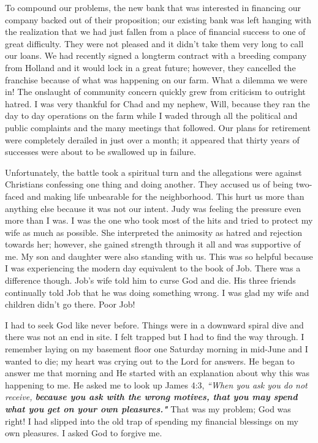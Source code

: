 \documentclass[oneside,12pt]{book}
\begin{document}
To compound our problems, the new bank that was interested in financing our company backed out of their proposition; our existing bank was left hanging with the realization that we had just fallen from a place of financial success to one of great difficulty. They were not pleased and it didn't take them very long to call our loans. We had recently signed a longterm contract with a breeding company from Holland and it would lock in a great future; however, they cancelled the franchise because of what was happening on our farm. What a dilemma we were in! The onslaught of community concern quickly grew from criticism to outright hatred. I was very thankful for Chad and my nephew, Will, because they ran the day to day operations on the farm while I waded through all the political and public complaints and the many meetings that followed. Our plans for retirement were completely derailed in just over a month; it appeared that thirty years of successes were about to be swallowed up in failure.

Unfortunately, the battle took a spiritual turn and the allegations were against Christians confessing one thing and doing another. They accused us of being two-faced and making life unbearable for the neighborhood. This hurt us more than anything else because it was not our intent. Judy was feeling the pressure even more than I was. I was the one who took most of the hits and tried to protect my wife as much as possible. She interpreted the animosity as hatred and rejection towards her; however, she gained strength through it all and was supportive of me. My son and daughter were also standing with us. This was so helpful because I was experiencing the modern day equivalent to the book of Job. There was a difference though. Job's wife told him to curse God and die. His three friends continually told Job that he was doing something wrong. I was glad my wife and children didn't go there. Poor Job!


I had to seek God like never before. Things were in a downward spiral dive and there was not an end in site. I felt trapped but I had to find the way through. I remember laying on my basement floor one Saturday morning in mid-June and I wanted to die; my heart was crying out to the Lord for answers. He began to answer me that morning and He started with an explanation about why this was happening to me. He asked me to look up James 4:3, \textit{``When you ask you do not receive, \textbf{because you ask with the wrong motives, that you may spend what you get on your own pleasures."}} That was my problem; God was right! I had slipped into the old trap of spending my financial blessings on my own pleasures. I asked God to forgive me.
\end{document}
